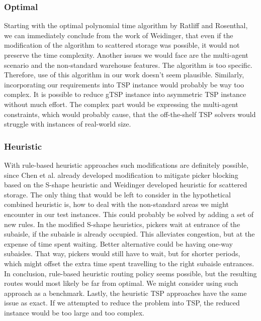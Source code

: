 \subsubsection{Optimal}
Starting with the optimal polynomial time algorithm by Ratliff and Rosenthal\cite{RR}, we can immediately conclude from the work of Weidinger\cite{weidinger2018}, that even if the modification of the algorithm to scattered storage was possible, it would not preserve the time complexity. Another issues we would face are the multi-agent scenario and the non-standard warehouse features. The algorithm is too specific. Therefore, use of this algorithm in our work doesn't seem plausible. Similarly, incorporating our requirements into TSP instance would probably be way too complex. It is possible to reduce gTSP instance into asymmetric TSP instance without much effort. The complex part would be expressing the multi-agent constraints, which would probably cause, that the off-the-shelf TSP solvers would struggle with instances of real-world size.
\par

\subsubsection{Heuristic}
With rule-based heuristic approaches such modifications are definitely possible, since Chen et al. already developed modification to mitigate picker blocking based on the S-shape heuristic\cite{chen2013ant} and Weidinger developed heuristic for scattered storage\cite{weidinger2018}. The only thing that would be left to consider in the hypothetical combined heuristic is, how to deal with the non-standard areas we might encounter in our test instances. This could probably be solved by adding a set of new rules. In the modified S-shape heuristics, pickers wait at entrance of the subaisle, if the subaisle is already occupied. This alleviates congestion, but at the expense of time spent waiting. Better alternative could be having one-way subaisles. That way, pickers would still have to wait, but for shorter periods, which might offset the extra time spent travelling to the right subaisle entrances. In conclusion, rule-based heuristic routing policy seems possible, but the resulting routes would most likely be far from optimal. We might consider using such approach as a benchmark. Lastly, the heuristic TSP approaches have the same issue as exact. If we attempted to reduce the problem into TSP, the reduced instance would be too large and too complex.
\par

